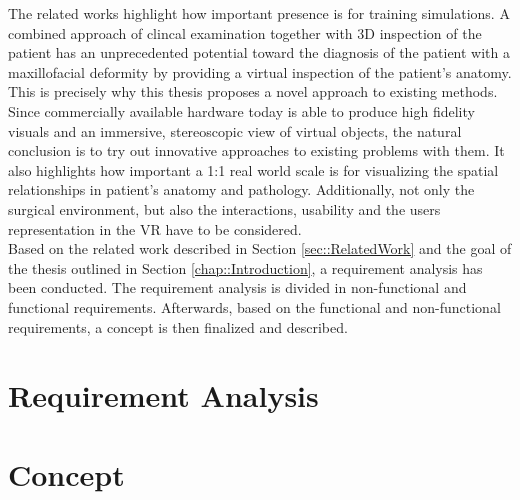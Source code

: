 The related works highlight how important presence is for training simulations.
A combined approach of clincal examination together with 3D inspection of the patient has an unprecedented potential toward the diagnosis of the patient with a maxillofacial deformity \cite{swennen2009three} by providing a virtual inspection of the patient’s anatomy.
This is precisely why this thesis proposes a novel approach to existing methods.
Since commercially available hardware today is able to produce high fidelity visuals and an immersive, stereoscopic view of virtual objects,
the natural conclusion is to try out innovative approaches to existing problems with them.
It also highlights how important a 1:1 real world scale is for visualizing the spatial relationships in patient's anatomy and pathology.
Additionally, not only the surgical environment, but also the interactions, usability and the users representation in the VR have to be considered.
\\ Based on the related work described in Section \ref{sec::RelatedWork} and the goal of the thesis outlined in Section \ref{chap::Introduction}, a requirement analysis has been conducted.
The requirement analysis is divided in non-functional and functional requirements.
Afterwards, based on the functional and non-functional requirements, a concept is then finalized and described.

\section{\label{sec::RequirementAnalysis}Requirement Analysis}

\section{\label{sec::Concept}Concept}
